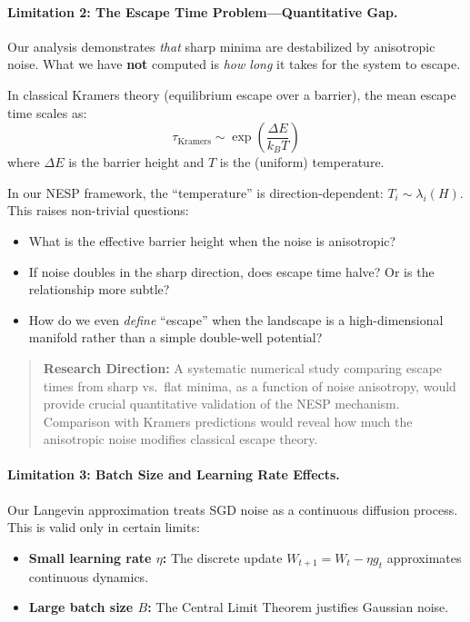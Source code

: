 \documentclass[
  journal=largetwo,
  simfonts=false,
  year=2025,
  volume=37,
]{cup-journal}
\begin{document}
\paragraph{Limitation 2: The Escape Time Problem---Quantitative Gap.}

Our analysis demonstrates \textit{that} sharp minima are destabilized by anisotropic noise. What we have \textbf{not} computed is \textit{how long} it takes for the system to escape.

In classical Kramers theory (equilibrium escape over a barrier), the mean escape time scales as:
\begin{equation}
    \tau_{\text{Kramers}} \sim \exp\left( \frac{\Delta E}{k_B T} \right)
\end{equation}
where $\Delta E$ is the barrier height and $T$ is the (uniform) temperature.

In our NESP framework, the ``temperature'' is direction-dependent: $T_i \sim \lambda_i(H)$. This raises non-trivial questions:
\begin{itemize}
    \item What is the effective barrier height when the noise is anisotropic?
    \item If noise doubles in the sharp direction, does escape time halve? Or is the relationship more subtle?
    \item How do we even \textit{define} ``escape'' when the landscape is a high-dimensional manifold rather than a simple double-well potential?
\end{itemize}

\begin{quote}
\textbf{Research Direction:} A systematic numerical study comparing escape times from sharp vs.\ flat minima, as a function of noise anisotropy, would provide crucial quantitative validation of the NESP mechanism. Comparison with Kramers predictions would reveal how much the anisotropic noise modifies classical escape theory.
\end{quote}

\paragraph{Limitation 3: Batch Size and Learning Rate Effects.}

Our Langevin approximation treats SGD noise as a continuous diffusion process. This is valid only in certain limits:
\begin{itemize}
    \item \textbf{Small learning rate $\eta$:} The discrete update $W_{t+1} = W_t - \eta g_t$ approximates continuous dynamics.
    \item \textbf{Large batch size $B$:} The Central Limit Theorem justifies Gaussian noise.
\end{itemize}
\end{document}
